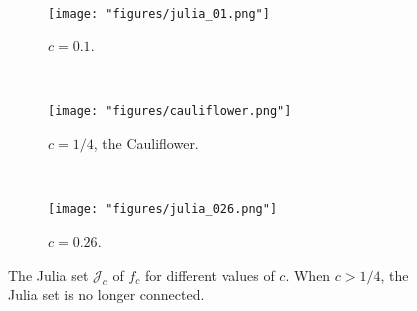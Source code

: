 \begin{figure*}[t!]
    \centering
    ~ 
    \begin{subfigure}[t]{0.3\textwidth}
        \centering
        \texttt{[image: "figures/julia\_01.png"]}
        \caption{$c=0.1$.}
    \end{subfigure}	
	~
    \begin{subfigure}[t]{0.25\textwidth}
        \centering
        \texttt{[image: "figures/cauliflower.png"]}
        \caption{$c=1/4$, the Cauliflower.}
    \end{subfigure}%
    ~ 
    \begin{subfigure}[t]{0.3\textwidth}
        \centering
        \texttt{[image: "figures/julia\_026.png"]}
        \caption{$c=0.26$.}
    \end{subfigure}
    \caption{The Julia set $\mathcal J_c$ of $f_c$ for different values of $c$. When $c>1/4$, the Julia set is no longer connected.}
\end{figure*}
